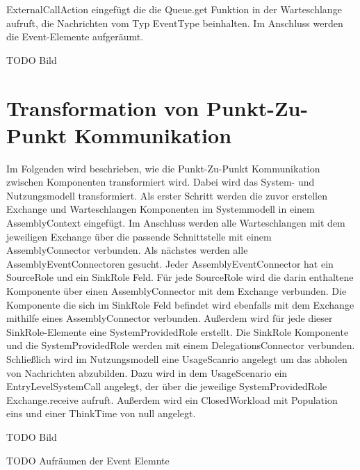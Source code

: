 ExternalCallAction eingefügt die die Queue.get Funktion in der Warteschlange aufruft, die Nachrichten vom Typ EventType beinhalten. Im Anschluss werden die Event-Elemente aufgeräumt.

TODO Bild


\section{Transformation von Punkt-Zu-Punkt Kommunikation}
Im Folgenden wird beschrieben, wie die Punkt-Zu-Punkt Kommunikation zwischen Komponenten transformiert wird. Dabei wird das System- und Nutzungsmodell transformiert. Als erster Schritt werden die zuvor erstellen Exchange und Warteschlangen Komponenten im Systemmodell in einem AssemblyContext eingefügt. Im Anschluss werden alle Warteschlangen mit dem jeweiligen Exchange über die passende Schnittstelle mit einem AssemblyConnector verbunden. Als nächstes werden alle AssemblyEventConnectoren gesucht. Jeder AssemblyEventConnector hat ein SourceRole und ein SinkRole Feld. Für jede SourceRole wird die darin enthaltene Komponente über einen AssemblyConnector mit dem Exchange verbunden. Die Komponente die sich im SinkRole Feld befindet wird ebenfalls mit dem Exchange mithilfe eines AssemblyConnector verbunden. Außerdem wird für jede dieser SinkRole-Elemente eine SystemProvidedRole erstellt. Die SinkRole Komponente und die SystemProvidedRole werden mit einem DelegationsConnector verbunden. Schließlich wird im Nutzungsmodell eine UsageScanrio angelegt um das abholen von Nachrichten abzubilden. Dazu wird in dem UsageScenario ein EntryLevelSystemCall angelegt, der über die jeweilige SystemProvidedRole Exchange.receive aufruft. Außerdem wird ein ClosedWorkload mit Population eins und einer ThinkTime von null angelegt.

TODO Bild

TODO Aufräumen der Event Elemnte

